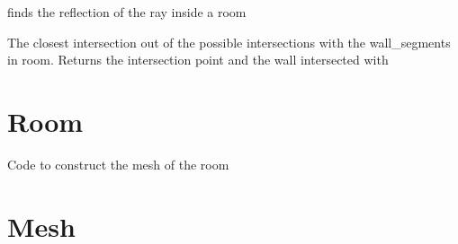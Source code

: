 \documentclass[letterpaper,10pt,english]{sphinxmanual}
\begin{document}
\begin{fulllineitems}
\begin{fulllineitems}
\end{fulllineitems}


\begin{fulllineitems}
\label{index:Rays.Ray.reflect_calc}
finds the reflection of the ray inside a room

\end{fulllineitems}


\begin{fulllineitems}
\label{index:Rays.Ray.room_collision_point}
The closest intersection out of the possible intersections with
the wall\_segments in room. Returns the intersection point and the
wall intersected with

\end{fulllineitems}


\end{fulllineitems}



\chapter{Room}
\label{index:room}\label{index:module-Room}
Code to construct the mesh of the room


\chapter{Mesh}
\label{index:module-DictionarySparseMatrix}\label{index:mesh}
\end{document}

